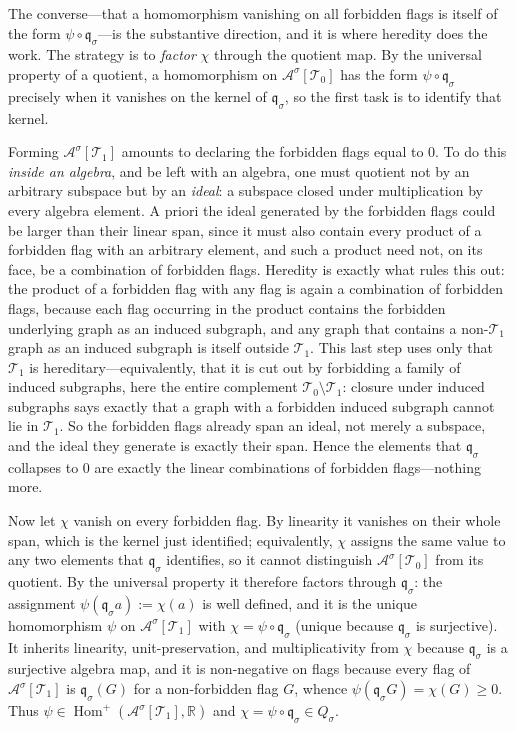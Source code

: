 \documentclass[11pt]{article}
\theoremstyle{definition}
\newcommand{\R}{\mathbb{R}}
\newcommand{\A}{\mathcal{A}}
\newcommand{\T}{\mathcal{T}}
\newcommand{\Homp}{\operatorname{Hom}^{+}}
\newcommand{\qmap}{\mathfrak q}
\begin{document}
The converse---that a homomorphism vanishing on all forbidden flags is itself of the form
$\psi\circ\qmap_\sigma$---is the substantive direction, and it is where heredity does the
work.  The strategy is to \emph{factor} $\chi$ through the quotient map.  By the universal
property of a quotient, a homomorphism on $\A^\sigma[\T_0]$ has the form
$\psi\circ\qmap_\sigma$ precisely when it vanishes on the kernel of $\qmap_\sigma$, so the
first task is to identify that kernel.

Forming $\A^\sigma[\T_1]$ amounts to declaring the forbidden flags equal to $0$.  To do
this \emph{inside an algebra}, and be left with an algebra, one must quotient not by an
arbitrary subspace but by an \emph{ideal}: a subspace closed under multiplication by every
algebra element.  A priori the ideal generated by the forbidden flags could be larger than
their linear span, since it must also contain every product of a forbidden flag with an
arbitrary element, and such a product need not, on its face, be a combination of forbidden
flags.  Heredity is exactly what rules this out: the product of a forbidden flag with any
flag is again a combination of forbidden flags, because each flag occurring in the product
contains the forbidden underlying graph as an induced subgraph, and any graph that contains
a non-$\T_1$ graph as an induced subgraph is itself outside $\T_1$.  This last step uses
only that $\T_1$ is hereditary---equivalently, that it is cut out by forbidding a family of
induced subgraphs, here the entire complement $\T_0\setminus\T_1$: closure under induced
subgraphs says exactly that a graph with a forbidden induced subgraph cannot lie in $\T_1$.
So the forbidden flags already span an ideal, not merely a subspace, and the ideal they
generate is exactly their span.  Hence the elements that $\qmap_\sigma$ collapses to $0$ are exactly the linear
combinations of forbidden flags---nothing more.

Now let $\chi$ vanish on every forbidden flag.  By linearity it vanishes on their whole
span, which is the kernel just identified; equivalently, $\chi$ assigns the same value to
any two elements that $\qmap_\sigma$ identifies, so it cannot distinguish $\A^\sigma[\T_0]$
from its quotient.  By the universal property it therefore factors through $\qmap_\sigma$:
the assignment $\psi(\qmap_\sigma a):=\chi(a)$ is well defined, and it is the unique
homomorphism $\psi$ on
$\A^\sigma[\T_1]$ with $\chi=\psi\circ\qmap_\sigma$ (unique because $\qmap_\sigma$ is
surjective).  It inherits linearity, unit-preservation, and multiplicativity from $\chi$
because $\qmap_\sigma$ is a surjective algebra map, and it is non-negative on flags because
every flag of $\A^\sigma[\T_1]$ is $\qmap_\sigma(G)$ for a non-forbidden flag $G$, whence
$\psi(\qmap_\sigma G)=\chi(G)\ge0$.  Thus $\psi\in\Homp(\A^\sigma[\T_1],\R)$ and
$\chi=\psi\circ\qmap_\sigma\in Q_\sigma$.
\end{document}
